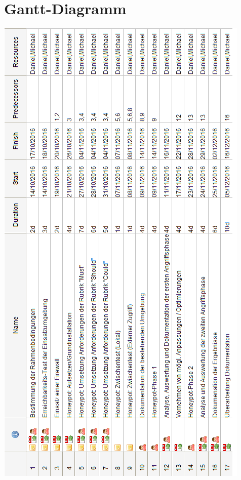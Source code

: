 \chapter{Gantt-Diagramm}
\label{sec:Gantt-Diagramm}

\begin{center}
\includegraphics[scale=0.78]{img/gantt_tasks.png}
\end{center}

\newpage

